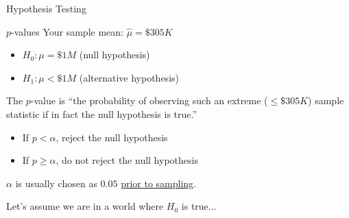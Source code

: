 \documentclass{beamer}\usepackage[]{graphicx}\usepackage[]{color}
\begin{document}
\begin{darkframes}
\begin{frame}[label=lists]{Hypothesis Testing}
	\end{frame}
	
	
	\begin{frame}[label=lists]{$p$-values}
		Your sample mean: $\hat\mu=\$305K$  \pause
	
    \begin{itemize}[<+->]
		  \item $H_0: \mu=\$1M$	(null hypothesis)
		  \item $H_1: \mu<\$1M$	(alternative hypothesis)
    \end{itemize}
		
		The \alert{$p$-value} is ``the probability of observing such an extreme ($\leq \$305K$) sample statistic if in fact the null hypothesis is true.'' \pause
		
		\begin{itemize}
		\item If $p < \alpha$, reject the null hypothesis \pause
		\item If $p \geq \alpha$, do not reject the null hypothesis \pause
		
		\end{itemize}		
		
		
		$\alpha$ is usually chosen as $0.05$ \underline{prior to sampling}.		
		

	\end{frame}

  \begin{frame}
  \end{frame}
	
	
	\begin{frame}[label=lists]{Let's assume we are in a world where $H_0$ is true...}
    \pause
		\begin{figure} 
				\centering
				\setlength\fboxsep{0pt}
				\setlength\fboxrule{0.2pt} 
		\end{figure}
    \pause


\end{frame}
\end{darkframes}
\end{document}
